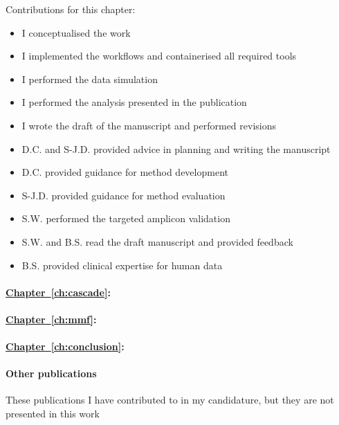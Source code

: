 {Contributions for this chapter:
\begin{itemize}
	\item I conceptualised the work
	\item I implemented the workflows and containerised all required tools
	\item I performed the data simulation
	\item I performed the analysis presented in the publication
	
	\item I wrote the draft of the manuscript and performed revisions
	\item D.C. and S-J.D. provided advice in planning and writing the manuscript
	\item D.C. provided guidance for method development
	\item S-J.D. provided guidance for method evaluation
	\item S.W. performed the targeted amplicon validation
	\item S.W. and  B.S. read the draft manuscript and provided feedback
	\item B.S. provided clinical expertise for human data
	
\end{itemize}



\paragraph{\hyperref[ch:cascade]{Chapter~\ref*{ch:cascade}}:} 


\paragraph{\hyperref[ch:mmf]{Chapter~\ref*{ch:mmf}}:}

\paragraph{\hyperref[ch:conclusion]{Chapter~\ref*{ch:conclusion}}:}


\paragraph{Other publications} These publications I have contributed to in my candidature, but they are not presented in this work

}
